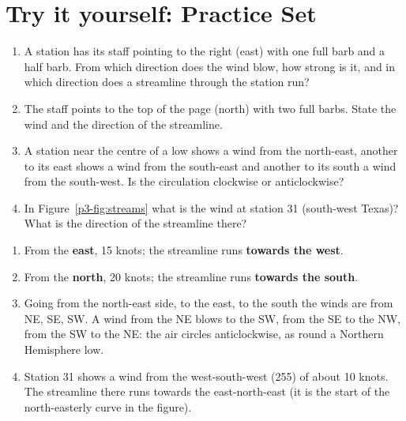 \section{Try it yourself: Practice Set~\thechapter}

\begin{tryit}
\begin{enumerate}[label=\textbf{\thechapter.\arabic*},leftmargin=*,itemsep=3pt]
\item A station has its staff pointing to the right (east) with one full barb and a half barb. From which direction does the wind blow, how strong is it, and in which direction does a streamline through the station run?
\item The staff points to the top of the page (north) with two full barbs. State the wind and the direction of the streamline.
\item A station near the centre of a low shows a wind from the north-east, another to its east shows a wind from the south-east and another to its south a wind from the south-west. Is the circulation clockwise or anticlockwise?
\item In Figure~\ref{p3-fig:streams} what is the wind at station 31 (south-west Texas)? What is the direction of the streamline there?
\end{enumerate}
\end{tryit}

\begin{answerbox}
\begin{enumerate}[label=\textbf{\thechapter.\arabic*},leftmargin=*,itemsep=3pt]
\item From the \textbf{east}, 15 knots; the streamline runs \textbf{towards the west}.
\item From the \textbf{north}, 20 knots; the streamline runs \textbf{towards the south}.
\item Going from the north-east side, to the east, to the south the winds are from NE, SE, SW. A wind from the NE blows to the SW, from the SE to the NW, from the SW to the NE: the air circles anticlockwise, as round a Northern Hemisphere low.
\item Station 31 shows a wind from the west-south-west (255\deg) of about 10 knots. The streamline there runs towards the east-north-east (it is the start of the north-easterly curve in the figure).
\end{enumerate}
\end{answerbox}
